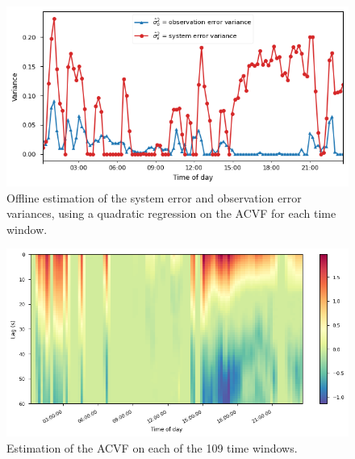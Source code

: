 \documentclass{article}
\begin{document}


\newpage
\setcounter{tocdepth}{3}
\tableofcontents
{}

\setcounter{page}{0}


\clearpage \newpage
{}
\setcounter{page}{1}
\newpage
\appendixpage
\appendix
\renewcommand{\figurename}{Appendix}
\setcounter{figure}{0}

\begin{figure}[h]
    \centering
    \includegraphics[width=0.8\linewidth]{images/var_fig.png}
    \caption{Offline estimation of the system error and observation error variances, using a quadratic regression on the ACVF for each time window.}
    \label{fig:my_label}
\end{figure}

\begin{figure}[h]
    \centering
    \includegraphics[width=0.8\linewidth]{images/acvf_fig.png}
    \caption{Estimation of the ACVF on each of the 109 time windows.}
    \label{fig:acvfs}
\end{figure}


\newpage
\nocite{*}


\end{document}
